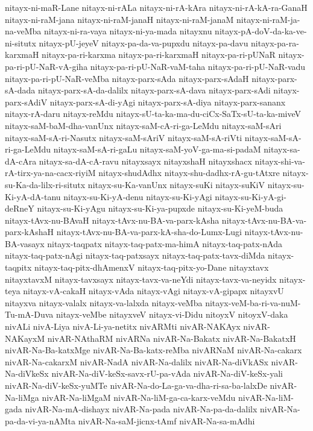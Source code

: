{nitayx-ni-maR-Lane
nitayx-ni-rALa
nitayx-ni-rA-kAra
nitayx-ni-rA-kA-ra-GanaH
nitayx-ni-raM-jana
nitayx-ni-raM-janaH
nitayx-ni-raM-janaM
nitayx-ni-raM-ja-na-veMba
nitayx-ni-ra-vaya
nitayx-ni-ya-mada
nitayxnu
nitayx-pA-doV-da-ka-ve-ni-situtx
nitayx-pU-jeyeV
nitayx-pa-da-va-pupxdu
nitayx-pa-davu
nitayx-pa-ra-karxmaH
nitayx-pa-ri-karxma
nitayx-pa-ri-karxmaH
nitayx-pa-ri-pUNaR
nitayx-pa-ri-pU-NaR-vA-giha
nitayx-pa-ri-pU-NaR-vaM-taha
nitayx-pa-ri-pU-NaR-vadu
nitayx-pa-ri-pU-NaR-veMba
nitayx-parx-sAda
nitayx-parx-sAdaH
nitayx-parx-sA-dada
nitayx-parx-sA-da-dalilx
nitayx-parx-sA-dava
nitayx-parx-sAdi
nitayx-parx-sAdiV
nitayx-parx-sA-di-yAgi
nitayx-parx-sA-diya
nitayx-parx-sananx
nitayx-rA-daru
nitayx-reMdu
nitayx-sU-ta-ka-ma-du-ciCx-SaTx-sU-ta-ka-miveV
nitayx-saM-baM-dha-vanUnx
nitayx-saM-cA-ri-ga-LeMdu
nitayx-saM-sAri
nitayx-saM-sA-ri-Nasutx
nitayx-saM-sAriV
nitayx-saM-sA-riVti
nitayx-saM-sA-ri-ga-LeMdu
nitayx-saM-sA-ri-gaLu
nitayx-saM-yoV-ga-ma-si-padaM
nitayx-sa-dA-cAra
nitayx-sa-dA-cA-ravu
nitayxsayx
nitayxshaH
nitayxshacx
nitayx-shi-va-rA-tirx-ya-na-cacx-riyiM
nitayx-shudAdhx
nitayx-shu-dadhx-rA-gu-tAtxre
nitayx-su-Ka-da-lilx-ri-situtx
nitayx-su-Ka-vanUnx
nitayx-suKi
nitayx-suKiV
nitayx-su-Ki-yA-dA-tanu
nitayx-su-Ki-yA-denu
nitayx-su-Ki-yAgi
nitayx-su-Ki-yA-gi-deRneY
nitayx-su-Ki-yAgu
nitayx-su-Ki-ya-pupxde
nitayx-su-Ki-yeM-buda
nitayx-tAvx-nu-BAvaH
nitayx-tAvx-nu-BA-va-parx-kAsha
nitayx-tAvx-nu-BA-va-parx-kAshaH
nitayx-tAvx-nu-BA-va-parx-kA-sha-do-Lumx-Lugi
nitayx-tAvx-nu-BA-vasayx
nitayx-taqpatx
nitayx-taq-patx-ma-himA
nitayx-taq-patx-nAda
nitayx-taq-patx-nAgi
nitayx-taq-patxsayx
nitayx-taq-patx-tavx-diMda
nitayx-taqpitx
nitayx-taq-pitx-dhAmenxV
nitayx-taq-pitx-yo-Dane
nitayxtavx
nitayxtavxM
nitayx-tavxsayx
nitayx-tavx-va-neYdi
nitayx-tavx-va-neyidx
nitayx-teya
nitayx-vA-cakaH
nitayx-vAda
nitayx-vAgi
nitayx-vA-gipapx
nitayxvU
nitayxva
nitayx-valalx
nitayx-va-lalxda
nitayx-veMba
nitayx-veM-ba-ri-va-nuM-Tu-mA-Duva
nitayx-veMbe
nitayxveV
nitayx-vi-Didu
nitoyxV
nitoyxV-daka
nivALi
nivA-Liya
nivA-Li-ya-netitx
nivARMti
nivAR-NAKAyx
nivAR-NAKayxM
nivAR-NAthaRM
nivARNa
nivAR-Na-Bakatx
nivAR-Na-BakatxH
nivAR-Na-Ba-katxMge
nivAR-Na-Ba-katx-reMba
nivARNaM
nivAR-Na-cakarx
nivAR-Na-cakarxM
nivAR-NadA
nivAR-Na-dalilx
nivAR-Na-diVkASx
nivAR-Na-diVkeSx
nivAR-Na-diV-keSx-savx-rU-pa-vAda
nivAR-Na-diV-keSx-yali
nivAR-Na-diV-keSx-yuMTe
nivAR-Na-do-La-ga-va-dha-ri-sa-ba-lalxDe
nivAR-Na-liMga
nivAR-Na-liMgaM
nivAR-Na-liM-ga-ca-karx-veMdu
nivAR-Na-liM-gada
nivAR-Na-mA-dishayx
nivAR-Na-pada
nivAR-Na-pa-da-dalilx
nivAR-Na-pa-da-vi-ya-nAMta
nivAR-Na-saM-jicnx-tAmf
nivAR-Na-sa-mAdhi
}
